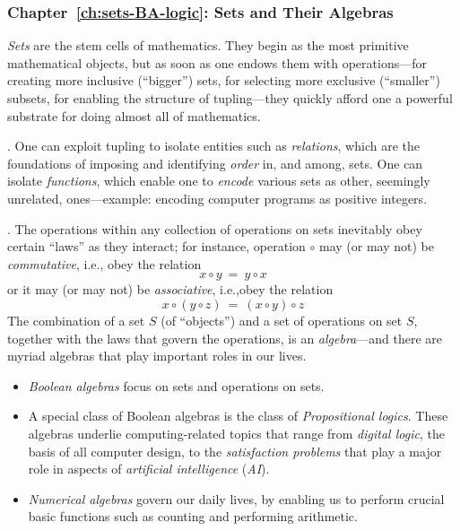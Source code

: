 \subsubsection{Chapter~\ref{ch:sets-BA-logic}: Sets and Their Algebras}

{\em Sets} are the stem cells of mathematics.  They begin as the most
primitive mathematical objects, but as soon as one endows them with
operations---for creating more inclusive (``bigger'') sets, for
selecting more exclusive (``smaller'') subsets, for enabling the
structure of tupling---they quickly afford one a powerful substrate
for doing almost all of mathematics.

\medskip

.
%
One can exploit tupling to isolate entities such as {\em relations},
which are the foundations of imposing and identifying {\em order} in,
and among, sets.  One can isolate {\em functions}, which enable one to
{\em encode} various sets as other, seemingly unrelated,
ones---example: encoding computer programs as positive integers.

\medskip

.
%
The operations within any collection of operations on sets inevitably
obey certain ``laws'' as they interact; for instance, operation
$\circ$ may (or may not) be {\em commutative}, i.e., obey the relation
\[ x \circ y \ = \ y \circ x \]
or it may (or may not) be {\em associative}, i.e.,obey the relation
\[ x \circ (y \circ z) \ = \ (x \circ y) \circ z \]
The combination of a set $S$ (of ``objects'') and a set of operations
on set $S$, together with the laws that govern the operations, is an
{\em algebra}---and there are myriad algebras that play important
roles in our lives.
\begin{itemize}
\item
{\em Boolean algebras} focus on sets and operations on sets.
\item
A special class of Boolean algebras is the class of {\em Propositional
  logics}.  These algebras underlie computing-related topics that
range from {\em digital logic}, the basis of all computer design, to the
{\em satisfaction problems} that play a major role in aspects of
{\em artificial intelligence} ({\em AI}).
\item
{\em Numerical algebras} govern our daily lives, by enabling us to
perform crucial basic functions such as
counting and performing arithmetic.
\end{itemize}


